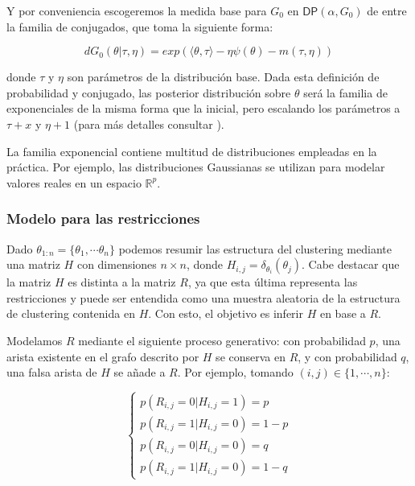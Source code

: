 Y por conveniencia escogeremos la medida base para $G_0$ en $\mathsf{DP}(\alpha, G_0)$ de entre la familia de conjugados, que toma la siguiente forma:

\begin{equation}
d G_0(\theta| \tau, \eta) = exp(\langle \theta, \tau \rangle - \eta\psi(\theta) - m(\tau, \eta))
\label{eqn49}
\end{equation}

donde $\tau$ y $\eta$ son parámetros de la distribución base. Dada esta definición de probabilidad y conjugado, las posterior distribución sobre $\theta$ será la familia de exponenciales de la misma forma que la inicial, pero escalando los parámetros a $\tau + x$ y $\eta + 1$ (para más detalles consultar \cite{RDPM:2015}).

La familia exponencial contiene multitud de distribuciones empleadas en la práctica. Por ejemplo, las distribuciones Gaussianas se utilizan para modelar valores reales en un espacio $\mathbb{R}^p$. 

\subsubsection{Modelo para las restricciones}

Dado $\theta_{1:n} = \{\theta_1, \cdots \theta_n\}$ podemos resumir las estructura del clustering mediante una matriz $H$ con dimensiones $n\times n$, donde $H_{i,j} = \delta_{\theta_i}(\theta_j)$. Cabe destacar que la matriz $H$ es distinta a la matriz $R$, ya que esta última representa las restricciones y puede ser entendida como una muestra aleatoria de la estructura de clustering contenida en $H$. Con esto, el objetivo es inferir $H$ en base a $R$.

Modelamos $R$ mediante el siguiente proceso generativo: con probabilidad $p$, una arista existente en el grafo descrito por $H$ se conserva en $R$, y con probabilidad $q$, una falsa arista de $H$ se añade a $R$. Por ejemplo, tomando $(i,j) \in \{1, \cdots, n\}$:

\begin{equation}
\begin{cases}
p(R_{i,j} = 0 | H_{i,j} = 1) = p\\
p(R_{i,j} = 1 | H_{i,j} = 0) = 1 - p\\
p(R_{i,j} = 0 | H_{i,j} = 0) = q\\
p(R_{i,j} = 1 | H_{i,j} = 0) = 1 - q
\end{cases}
\label{eqn50}
\end{equation}


